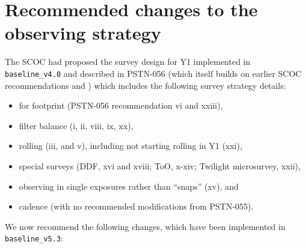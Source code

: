 \documentclass[SE,authoryear,toc]{lsstdoc}
\begin{document}
\section{Recommended changes to the observing strategy}\label{sec:recommendation}
The SCOC had proposed the survey design for Y1 implemented in \texttt{baseline\_v4.0} and described in PSTN-056 (which itself builds on earlier SCOC recommendations \citealt{pstn-053} and  \citealt{pstn-055})  which includes the following survey strategy details: 
\begin{itemize}
    \item for footprint (PSTN-056 recommendation vi and xxiii), 
    \item filter balance (i, ii, viii, ix, xx), 
    \item rolling (iii, and v), including not starting rolling in Y1 (xxi), 
    \item special surveys (DDF, xvi and xviii; ToO, x-xiv; Twilight microsurvey, xxii), 
    \item observing in single exposures rather than ``snaps'' (xv), and \item cadence (with no recommended modifications from PSTN-055).
\end{itemize}
We now recommend the following changes, which have been implemented in \texttt{baseline\_v5.3}:
\end{document}
